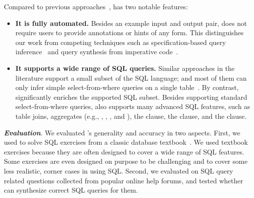 Compared to previous approaches~\cite{Zloof:1975,
Tran:2009, DasSarma:2010, abs-1208-2013}, \ourtool has two notable features:

\begin{itemize}
\item \textbf{It is fully automated.} Besides
an example input and output pair,
\ourtool does not require users to provide
annotations or hints of any form. 
This distinguishes our work from competing techniques such as
specification-based query inference~\cite{Zloof:1975} and
query synthesis from imperative code~\cite{abs-1208-2013}.

\item \textbf{It supports a wide range of SQL queries.}
Similar approaches in the literature support
a small subset of the SQL language; and most of them
can only infer simple select-from-where
queries on a single table~\cite{Zloof:1975, DasSarma:2010, Tran:2009, DasSarma:2010, abs-1208-2013}. By contrast, 
\ourtool significantly enriches the supported SQL subset.
Besides supporting standard select-from-where
queries, \ourtool also supports many advanced
SQL features, such as table joins,
aggregates (e.g., , , ,
and ), the  clause,
the  clause, and the  clause.
\end{itemize}






\vspace{1mm}
\noindent \textbf{\textit{Evaluation}}.
We evaluated \ourtool's generality and accuracy
in two aspects. First, we used \ourtool to solve
\exnum SQL exercises from a classic database textbook~\cite{cowbook}. 
We used textbook exercises because they
are often designed to cover a wide range of SQL features.
Some exercises are even designed on purpose
to be challenging and to cover some less realistic,
corner cases in using SQL.
Second, we evaluated \ourtool on \pnum SQL query related
questions collected from popular online help forums, and tested whether
\ourtool can synthesize correct SQL queries for them.

